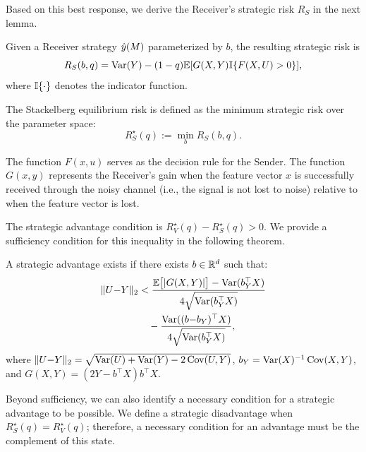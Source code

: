 Based on this best response, we derive the Receiver's strategic risk $R_S$ in the next lemma.

\begin{lemma} \label{lem:rs_regression}
  Given a Receiver strategy $\hat{y}(M)$ parameterized by $b$, the resulting strategic risk is
  \begin{equation}
    R_S(b, q) = \operatorname{Var}(Y) - (1-q)\mathbb{E}[G(X,Y)\mathbb{I}\{F(X,U) > 0\}],
  \end{equation}
  where $\mathbb{I}\{\cdot\}$ denotes the indicator function.
\end{lemma}

\begin{remark}
The Stackelberg equilibrium risk is defined as the minimum strategic risk over the parameter space:
\begin{equation*}
  R_S^\star(q) := \min_b R_S(b, q).
\end{equation*}
\end{remark}

\begin{remark}
The function $F(x,u)$ serves as the decision rule for the Sender. The function $G(x,y)$ represents the Receiver's gain when the feature vector $x$ is successfully received through the noisy channel (i.e., the signal is not lost to noise) relative to when the feature vector is lost.
\end{remark}

The strategic advantage condition is $R_V^\star(q) - R_S^\star(q) > 0$. We provide a sufficiency condition for this inequality in the following theorem.

\begin{theorem} \label{thm:sufficiency_reg}
  A strategic advantage exists if there exists $b \in \mathbb{R}^d$ such that:
\begin{align}
    \|U{-}Y\|_2 
    &< 
    \frac{\mathbb{E}\big[| G(X,Y)|\big] 
    - \operatorname{Var}(b_Y^\top X)}{4\sqrt{\operatorname{Var}(b_Y^\top X)}} \nonumber \\
    &\quad - \frac{\operatorname{Var}((b{-}b_Y)^\top X)}{4\sqrt{\operatorname{Var}(b_Y^\top X)}}, \label{eq:sufficiency_reg}
\end{align}
  where $\|U{-}Y\|_2 = \sqrt{\operatorname{Var}(U) + \operatorname{Var}(Y) - 2 \operatorname{Cov}(U,Y)}$, $b_Y = \operatorname{Var}(X)^{-1}\operatorname{Cov}(X,Y)$, and $G(X,Y) = (2Y - b^\top X) b^\top X$.
\end{theorem}

Beyond sufficiency, we can also identify a necessary condition for a strategic advantage to be possible. We define a strategic disadvantage when $R_S^\star(q) = R_V^\star(q)$; therefore, a necessary condition for an advantage must be the complement of this state.


